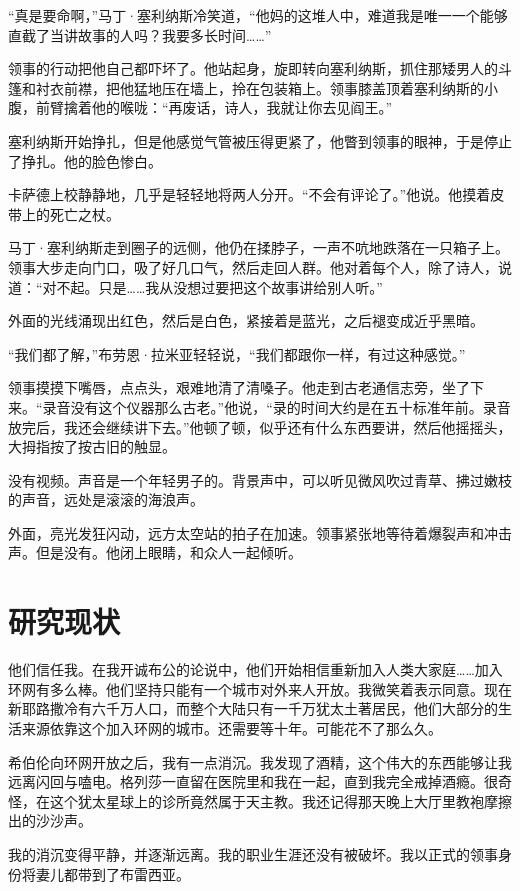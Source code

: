 \documentclass[
  b5paper, 
  10pt, 
  AutoFakeBold, 
  AutoFakeSlant
]{article}
\begin{document}
“真是要命啊，”马丁·塞利纳斯冷笑道，“他妈的这堆人中，难道我是唯一一个能够直截了当讲故事的人吗？我要多长时间……”

领事的行动把他自己都吓坏了。他站起身，旋即转向塞利纳斯，抓住那矮男人的斗篷和衬衣前襟，把他猛地压在墙上，拎在包装箱上。领事膝盖顶着塞利纳斯的小腹，前臂擒着他的喉咙：“再废话，诗人，我就让你去见阎王。”

塞利纳斯开始挣扎，但是他感觉气管被压得更紧了，他瞥到领事的眼神，于是停止了挣扎。他的脸色惨白。

卡萨德上校静静地，几乎是轻轻地将两人分开。“不会有评论了。”他说。他摸着皮带上的死亡之杖。

马丁·塞利纳斯走到圈子的远侧，他仍在揉脖子，一声不吭地跌落在一只箱子上。领事大步走向门口，吸了好几口气，然后走回人群。他对着每个人，除了诗人，说道：“对不起。只是……我从没想过要把这个故事讲给别人听。”

外面的光线涌现出红色，然后是白色，紧接着是蓝光，之后褪变成近乎黑暗。

“我们都了解，”布劳恩·拉米亚轻轻说，“我们都跟你一样，有过这种感觉。”

领事摸摸下嘴唇，点点头，艰难地清了清嗓子。他走到古老通信志旁，坐了下来。“录音没有这个仪器那么古老。”他说，“录的时间大约是在五十标准年前。录音放完后，我还会继续讲下去。”他顿了顿，似乎还有什么东西要讲，然后他摇摇头，大拇指按了按古旧的触显。

没有视频。声音是一个年轻男子的。背景声中，可以听见微风吹过青草、拂过嫩枝的声音，远处是滚滚的海浪声。

外面，亮光发狂闪动，远方太空站的拍子在加速。领事紧张地等待着爆裂声和冲击声。但是没有。他闭上眼睛，和众人一起倾听。

\section{研究现状}

他们信任我。在我开诚布公的论说中，他们开始相信重新加入人类大家庭……加入环网有多么棒。他们坚持只能有一个城市对外来人开放。我微笑着表示同意。现在新耶路撒冷有六千万人口，而整个大陆只有一千万犹太土著居民，他们大部分的生活来源依靠这个加入环网的城市。还需要等十年。可能花不了那么久。

希伯伦向环网开放之后，我有一点消沉。我发现了酒精，这个伟大的东西能够让我远离闪回与嗑电。格列莎一直留在医院里和我在一起，直到我完全戒掉酒瘾。很奇怪，在这个犹太星球上的诊所竟然属于天主教。我还记得那天晚上大厅里教袍摩擦出的沙沙声。

我的消沉变得平静，并逐渐远离。我的职业生涯还没有被破坏。我以正式的领事身份将妻儿都带到了布雷西亚。
\end{document}
